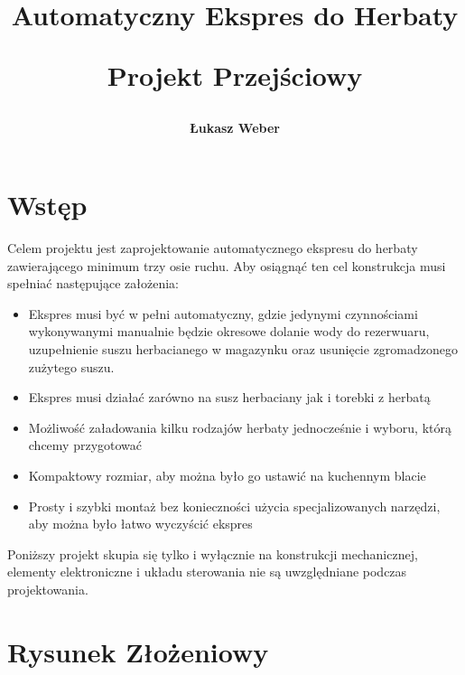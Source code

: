\documentclass[a4paper,12pt, openany]{article}
\begin{document}
\title{\textbf{Automatyczny Ekspres do Herbaty} \\
    \begin{large}
     \textbf{Projekt Przejściowy}
    \end{large}
}

\author{\textbf{Łukasz Weber}}

\maketitle

\section{Wstęp}

Celem projektu jest zaprojektowanie automatycznego ekspresu do herbaty zawierającego minimum trzy osie ruchu. Aby osiągnąć ten cel konstrukcja musi spełniać następujące założenia:

\begin{itemize}
 \item Ekspres musi być w pełni automatyczny, gdzie jedynymi czynnościami wykonywanymi manualnie będzie okresowe dolanie wody do rezerwuaru, uzupełnienie suszu herbacianego w magazynku oraz usunięcie zgromadzonego zużytego suszu.
 \item Ekspres musi działać zarówno na susz herbaciany jak i torebki z herbatą
 \item Możliwość załadowania kilku rodzajów herbaty jednocześnie i wyboru, którą chcemy przygotować
 \item Kompaktowy rozmiar, aby można było go ustawić na kuchennym blacie
 \item Prosty i szybki montaż bez konieczności użycia specjalizowanych narzędzi, aby można było łatwo wyczyścić ekspres
\end{itemize}

Poniższy projekt skupia się tylko i wyłącznie na konstrukcji mechanicznej, elementy elektroniczne i układu sterowania nie są uwzględniane podczas projektowania.

\section{Rysunek Złożeniowy}


\end{document}
